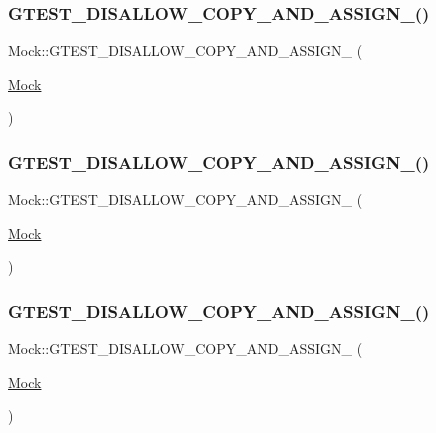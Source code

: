 \subsubsection{\texorpdfstring{GTEST\_DISALLOW\_COPY\_AND\_ASSIGN\_()}{GTEST\_DISALLOW\_COPY\_AND\_ASSIGN\_()}\hspace{0.1cm}{\footnotesize\ttfamily [1/6]}}
{\footnotesize\ttfamily Mock\+::\+G\+T\+E\+S\+T\+\_\+\+D\+I\+S\+A\+L\+L\+O\+W\+\_\+\+C\+O\+P\+Y\+\_\+\+A\+N\+D\+\_\+\+A\+S\+S\+I\+G\+N\+\_\+ (\begin{DoxyParamCaption}\item[{\mbox{\hyperlink{class_mock}{Mock}}}]{ }\end{DoxyParamCaption})\hspace{0.3cm}{\ttfamily [private]}}

\mbox{\label{class_mock_ab2c98b882136d91790d21e9299629662}} 
\subsubsection{\texorpdfstring{GTEST\_DISALLOW\_COPY\_AND\_ASSIGN\_()}{GTEST\_DISALLOW\_COPY\_AND\_ASSIGN\_()}\hspace{0.1cm}{\footnotesize\ttfamily [2/6]}}
{\footnotesize\ttfamily Mock\+::\+G\+T\+E\+S\+T\+\_\+\+D\+I\+S\+A\+L\+L\+O\+W\+\_\+\+C\+O\+P\+Y\+\_\+\+A\+N\+D\+\_\+\+A\+S\+S\+I\+G\+N\+\_\+ (\begin{DoxyParamCaption}\item[{\mbox{\hyperlink{class_mock}{Mock}}}]{ }\end{DoxyParamCaption})\hspace{0.3cm}{\ttfamily [private]}}

\mbox{\label{class_mock_ab2c98b882136d91790d21e9299629662}} 
\subsubsection{\texorpdfstring{GTEST\_DISALLOW\_COPY\_AND\_ASSIGN\_()}{GTEST\_DISALLOW\_COPY\_AND\_ASSIGN\_()}\hspace{0.1cm}{\footnotesize\ttfamily [3/6]}}
{\footnotesize\ttfamily Mock\+::\+G\+T\+E\+S\+T\+\_\+\+D\+I\+S\+A\+L\+L\+O\+W\+\_\+\+C\+O\+P\+Y\+\_\+\+A\+N\+D\+\_\+\+A\+S\+S\+I\+G\+N\+\_\+ (\begin{DoxyParamCaption}\item[{\mbox{\hyperlink{class_mock}{Mock}}}]{ }\end{DoxyParamCaption})\hspace{0.3cm}{\ttfamily [private]}}

